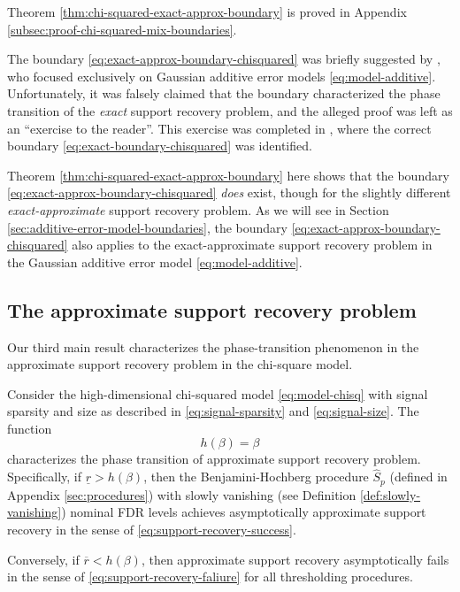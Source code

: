 Theorem \ref{thm:chi-squared-exact-approx-boundary} is proved in Appendix \ref{subsec:proof-chi-squared-mix-boundaries}. 

\begin{remark}
The boundary \eqref{eq:exact-approx-boundary-chisquared} was briefly suggested by \citet{arias2017distribution}, who focused exclusively on Gaussian additive error models \eqref{eq:model-additive}.
Unfortunately, it was falsely claimed that the boundary characterized the phase transition of the \emph{exact} support recovery problem, and the alleged proof was left as an ``exercise to the reader''.
This exercise was completed in \cite{gao2018fundamental}, where the correct boundary \eqref{eq:exact-boundary-chisquared} was identified. 

Theorem \ref{thm:chi-squared-exact-approx-boundary} here shows that the boundary \eqref{eq:exact-approx-boundary-chisquared} \emph{does} exist, though for the slightly different \emph{exact-approximate} support recovery problem.
As we will see in Section \ref{sec:additive-error-model-boundaries}, the boundary \eqref{eq:exact-approx-boundary-chisquared} also applies to the exact-approximate support recovery problem in the Gaussian additive error model \eqref{eq:model-additive}.
\end{remark}


\subsection{The approximate support recovery problem}
\label{subsec:approx-support-recovery-boundary}

Our third main result characterizes the phase-transition phenomenon in the approximate support recovery problem in the chi-square model.

\begin{theorem} \label{thm:chi-squared-approx-boundary}
Consider the high-dimensional chi-squared model \eqref{eq:model-chisq} with signal sparsity and size as described in \eqref{eq:signal-sparsity} and \eqref{eq:signal-size}.
The function 
\begin{equation} \label{eq:approx-boundary-chisquared}
    h(\beta) = \beta
\end{equation}
characterizes the phase transition of approximate support recovery problem.
Specifically, if $\underline{r} > {h}(\beta)$, then the Benjamini-Hochberg procedure $\widehat{S}_p$ (defined in Appendix \ref{sec:procedures}) with slowly vanishing (see Definition \ref{def:slowly-vanishing}) nominal FDR levels achieves asymptotically approximate support recovery in the sense of \eqref{eq:support-recovery-success}. 

Conversely, if $\overline{r} < {h}(\beta)$, then approximate support recovery asymptotically fails in the sense of \eqref{eq:support-recovery-faliure} for all thresholding procedures.
\end{theorem}

